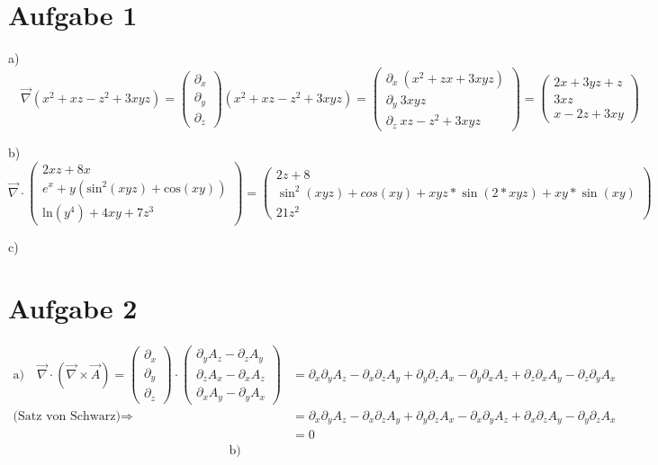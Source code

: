 \documentclass[a4paper]{article}
\newcommand{\nabvec}{\vec{\nabla}}
\newcommand{\delx}{\partial_x}
\newcommand{\dely}{\partial_y}
\newcommand{\delz}{\partial_z}
\begin{document}
\thispagestyle{fancy}

\section*{Aufgabe 1}
\mbox{}
\par{a)} $ \quad \nabvec(x^2 + xz - z^2 + 3xyz)= 
\begin{pmatrix}
	\delx \\
	\dely \\
	\delz 
\end{pmatrix}
(x^2 + xz - z^2 + 3xyz)
	= 
\begin{pmatrix}
	\delx \ (x^2 + zx + 3xyz) \\
	\dely \ 3xyz \\
	\delz \ xz - z^2 + 3xyz
\end{pmatrix}
	=
\begin{pmatrix}
	2x + 3yz + z \\
	3xz \\
	x - 2z + 3xy
\end{pmatrix}
	$
\vspace{0.5cm} \par{b)} 
$ \nabvec \cdot
\begin{pmatrix}
	2xz+8x \\ e^x + y(\text{sin}^2(xyz) + \text{cos}(xy)) \\ \text{ln}(y^4) + 4xy + 7z^3
\end{pmatrix}
=
\begin{pmatrix}
	2z + 8 \\
	\sin^2(xyz) + cos(xy) + xyz*\sin(2*xyz) + xy*\sin(xy) \\
	21 z^2
\end{pmatrix}
$
\vspace{0.5cm} \par{c)}
\section*{Aufgabe 2}
\begin{align*}
	\text{a)} \quad \nabvec \cdot \left(\nabvec \times \vec A \right) = 
\begin{pmatrix}	\delx \\ \dely \\ \delz \end{pmatrix} \cdot
\begin{pmatrix} 
	\dely A_z - \delz A_y \\ \delz A_x - \delx A_z \\ \delx A_y - \dely A_x
\end{pmatrix}
	&=
\delx\dely A_z - \delx\delz A_y + \dely\delz A_x - \dely\delx A_z + \delz\delx A_y - \delz\dely A_x \\
	\text{(Satz von Schwarz)}\Rightarrow &=
\delx\dely A_z - \delx\delz A_y + \dely\delz A_x - \delx\dely A_z + \delx\delz A_y - \dely\delz A_x \\
	&= 0
\end{align*}
\begin{align*}
	\text{b)} 
\end{align*}
\end{document}
